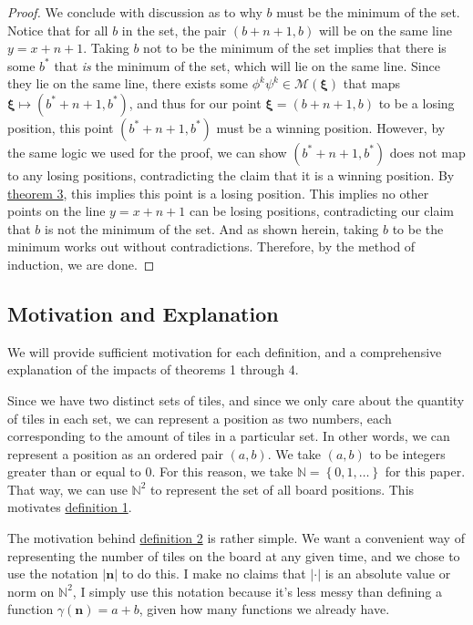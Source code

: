 \documentclass[11pt, letterpaper]{article}
\begin{document}
\begin{proof}
We conclude with discussion as to why $b$ must be the minimum of the set. Notice that for all $b$ in the set, the pair $(b+n+1,b)$ will be on the same line $y=x+n+1$. Taking $b$ not to be the minimum of the set implies that there is some $b^*$ that \emph{is} the minimum of the set, which will lie on the same line. Since they lie on the same line, there exists some $\phi ^k\psi ^k\in \mathscr{M} \left( \boldsymbol{\xi}  \right) $ that maps $\boldsymbol{\xi} \mapsto \left( b^*+n+1,b^* \right) $, and thus for our point $\boldsymbol{\xi} =\left( b+n+1,b \right) $ to be a losing position, this point $\left( b^*+n+1,b^* \right) $ must be a winning position. However, by the same logic we used for the proof, we can show $\left( b^*+n+1,b^* \right) $ does not map to any losing positions, contradicting the claim that it is a winning position. By \hyperref[thm:3]{theorem 3}, this implies this point is a losing position. This implies no other points on the line $y=x+n+1$ can be losing positions, contradicting our claim that $b$ is not the minimum of the set. And as shown herein, taking $b$ to be the minimum works out without contradictions. Therefore, by the method of induction, we are done.
\end{proof}





\subsection{Motivation and Explanation}\label{sec:23}
We will provide sufficient motivation for each definition, and a comprehensive explanation of the impacts of theorems 1 through 4.

Since we have two distinct sets of tiles, and since we only care about the quantity of tiles in each set, we can represent a position as two numbers, each corresponding to the amount of tiles in a particular set. In other words, we can represent a position as an ordered pair $(a,b)$. We take $(a,b)$ to be integers greater than or equal to $0$. For this reason, we take $\mathbb{N}=\left\{ 0,1,\ldots \right\} $ for this paper. That way, we can use $\mathbb{N}^2$ to represent the set of all board positions. This motivates \hyperref[dfn:1]{definition 1}.

The motivation behind \hyperref[dfn:2]{definition 2} is rather simple. We want a convenient way of representing the number of tiles on the board at any given time, and we chose to use the notation $\left| \mathbf{n} \right| $ to do this. I make no claims that $\left| \cdot  \right| $ is an absolute value or norm on $\mathbb{N}^2$, I simply use this notation because it's less messy than defining a function $\gamma (\mathbf{n})=a+b$, given how many functions we already have.
\end{document}
